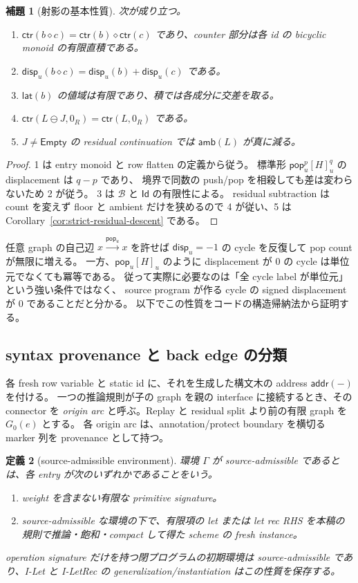 \documentclass[uplatex,dvipdfmx,a4paper,10.5pt]{jsarticle}
\theoremstyle{jpplain}
\newtheorem{definition}{定義}[section]
\newtheorem{lemma}[definition]{補題}
\newcommand{\Id}{\mathsf{Id}}
\newcommand{\Empty}{\mathsf{Empty}}
\newcommand{\takeop}[2]{[#1]_{#2}}
\newcommand{\popop}[1]{\mathsf{pop}_{#1}}
\newcommand{\Caps}{\mathcal B}
\newcommand{\amb}{\mathsf{amb}}
\newcommand{\ctr}{\mathsf{ctr}}
\newcommand{\lat}{\mathsf{lat}}
\newcommand{\disp}{\mathsf{disp}}
\newcommand{\addr}{\mathsf{addr}}
\begin{document}
\begin{lemma}[射影の基本性質]\label{lem:projection-properties}
次が成り立つ。
\begin{enumerate}
  \item $\ctr(b\diamond c)=\ctr(b)\diamond\ctr(c)$ であり、counter 部分は各 id の bicyclic monoid の有限直積である。
  \item $\disp_u(b\diamond c)=\disp_u(b)+\disp_u(c)$ である。
  \item $\lat(b)$ の値域は有限であり、積では各成分に交差を取る。
  \item $\ctr(L\ominus J,0_R)=\ctr(L,0_R)$ である。
  \item $J\neq\Empty$ の residual continuation では $\amb(L)$ が真に減る。
\end{enumerate}
\end{lemma}

\begin{proof}
1 は entry monoid と row flatten の定義から従う。
標準形 $\popop{u}^{p}\takeop{H}{u}^{q}$ の displacement は $q-p$ であり、
境界で同数の push/pop を相殺しても差は変わらないため 2 が従う。
3 は $\Caps$ と $\Id$ の有限性による。
residual subtraction は count を変えず floor と ambient だけを狭めるので 4 が従い、5 は Corollary~\ref{cor:strict-residual-descent} である。
\end{proof}

任意 graph の自己辺 $x\xrightarrow{\popop{u}}x$ を許せば
$\disp_u=-1$ の cycle を反復して pop count が無限に増える。
一方、$\popop{u}\takeop{H}{u}$ のように displacement が 0 の cycle は単位元でなくても冪等である。
従って実際に必要なのは「全 cycle label が単位元」という強い条件ではなく、
source program が作る cycle の signed displacement が 0 であることだと分かる。
以下でこの性質をコードの構造帰納法から証明する。

\subsection{syntax provenance と back edge の分類}

各 fresh row variable と static id に、それを生成した構文木の address $\addr(-)$ を付ける。
一つの推論規則が子の graph を親の interface に接続するとき、その connector を
\emph{origin arc} と呼ぶ。Replay と residual split より前の有限 graph を $G_0(e)$ とする。
各 origin arc は、annotation/protect boundary を横切る marker 列を provenance として持つ。

\begin{definition}[source-admissible environment]\label{def:source-admissible}
環境 $\Gamma$ が source-admissible であるとは、各 entry が次のいずれかであることをいう。
\begin{enumerate}
  \item weight を含まない有限な primitive signature。
  \item source-admissible な環境の下で、有限項の let または let rec RHS を本稿の規則で推論・飽和・compact して得た scheme の fresh instance。
\end{enumerate}
operation signature だけを持つ閉プログラムの初期環境は source-admissible であり、I-Let と I-LetRec の generalization/instantiation はこの性質を保存する。
\end{definition}
\end{document}
